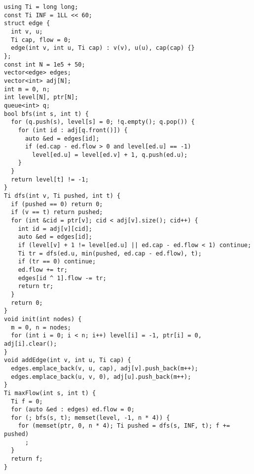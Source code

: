 \documentclass[FSZ,a4paper,onesided]{article}
\begin{document}
\begin{multicols*}{\COLS}
\begin{lstlisting}
using Ti = long long;
const Ti INF = 1LL << 60;
struct edge {
  int v, u;
  Ti cap, flow = 0;
  edge(int v, int u, Ti cap) : v(v), u(u), cap(cap) {}
};
const int N = 1e5 + 50;
vector<edge> edges;
vector<int> adj[N];
int m = 0, n;
int level[N], ptr[N];
queue<int> q;
bool bfs(int s, int t) {
  for (q.push(s), level[s] = 0; !q.empty(); q.pop()) {
    for (int id : adj[q.front()]) {
      auto &ed = edges[id];
      if (ed.cap - ed.flow > 0 and level[ed.u] == -1)
        level[ed.u] = level[ed.v] + 1, q.push(ed.u);
    }
  }
  return level[t] != -1;
}
Ti dfs(int v, Ti pushed, int t) {
  if (pushed == 0) return 0;
  if (v == t) return pushed;
  for (int &cid = ptr[v]; cid < adj[v].size(); cid++) {
    int id = adj[v][cid];
    auto &ed = edges[id];
    if (level[v] + 1 != level[ed.u] || ed.cap - ed.flow < 1) continue;
    Ti tr = dfs(ed.u, min(pushed, ed.cap - ed.flow), t);
    if (tr == 0) continue;
    ed.flow += tr;
    edges[id ^ 1].flow -= tr;
    return tr;
  }
  return 0;
}
void init(int nodes) {
  m = 0, n = nodes;
  for (int i = 0; i < n; i++) level[i] = -1, ptr[i] = 0, adj[i].clear();
}
void addEdge(int v, int u, Ti cap) {
  edges.emplace_back(v, u, cap), adj[v].push_back(m++);
  edges.emplace_back(u, v, 0), adj[u].push_back(m++);
}
Ti maxFlow(int s, int t) {
  Ti f = 0;
  for (auto &ed : edges) ed.flow = 0;
  for (; bfs(s, t); memset(level, -1, n * 4)) {
    for (memset(ptr, 0, n * 4); Ti pushed = dfs(s, INF, t); f += pushed)
      ;
  }
  return f;
}
\end{lstlisting}

\end{multicols*}
\end{document}
